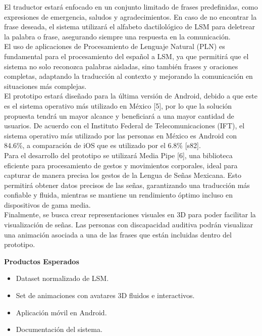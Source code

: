 El traductor estará enfocado en un conjunto limitado de frases predefinidas, como expresiones de emergencia, saludos y agradecimientos. En caso de no encontrar la frase deseada, el sistema utilizará el alfabeto dactilológico de LSM para deletrear la palabra o frase, asegurando siempre una respuesta en la comunicación.\\

El uso de aplicaciones de Procesamiento de Lenguaje Natural (PLN) es fundamental para el procesamiento del español a LSM, ya que permitirá que el sistema no solo reconozca palabras aisladas, sino también frases y oraciones completas, adaptando la traducción al contexto y mejorando la comunicación en situaciones más complejas.\\

El prototipo estará diseñado para la última versión de Android, debido a que este es el sistema operativo más utilizado en México [5], por lo que la solución propuesta tendrá un mayor alcance y beneficiará a una mayor cantidad de usuarios. De acuerdo con el Instituto Federal de Telecomunicaciones (IFT), el sistema operativo más utilizado por las personas en México es Android con 84.6\%, a comparación de iOS que es utilizado por el 6.8\% [s82].\\

Para el desarrollo del prototipo se utilizará Media Pipe [6], una biblioteca eficiente para procesamiento de gestos y movimientos corporales, ideal para capturar de manera precisa los gestos de la Lengua de Señas Mexicana. Esto permitirá obtener datos precisos de las señas, garantizando una traducción más confiable y fluida, mientras se mantiene un rendimiento óptimo incluso en dispositivos de gama media.\\

Finalmente, se busca crear representaciones visuales en 3D para poder facilitar la visualización de señas. Las personas con discapacidad auditiva podrán visualizar una animación asociada a una de las frases que están incluidas dentro del prototipo.
\newline

\textbf{Productos Esperados}
\begin{itemize}
    \item Dataset normalizado de LSM.
    \item Set de animaciones con avatares 3D fluidos e interactivos.
    \item Aplicación móvil en Android.
    \item Documentación del sistema.\\
\end{itemize}

